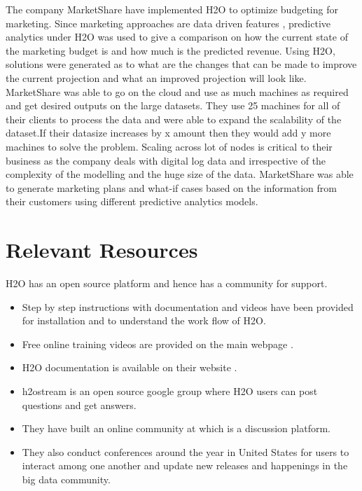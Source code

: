 \documentclass[9pt,twocolumn,twoside]{../../styles/osajnl}
\begin{document}
The company MarketShare have implemented H2O to optimize budgeting for
marketing. Since marketing approaches are data driven features ,
predictive analytics under H2O was used to give a comparison on how
the current state of the marketing budget is and how much is the
predicted revenue\cite{www-h2o-marketshare}. Using H2O, solutions were generated as to what are
the changes that can be made to improve the current projection and
what an improved projection will look like. MarketShare was able to go on the cloud and use as much
machines as required and get desired outputs on the large
datasets. They use 25 machines for all of their clients to process the
data and were able to expand the scalability of the dataset.If their
datasize increases by x amount then they would add y more machines to
solve the problem\cite{www-h2o-marketshare}. Scaling across lot of nodes is critical to their
business as the company deals with digital log data and irrespective
of the complexity of the modelling and the huge size of the data\cite{www-h2o-marketshare}. MarketShare was able to generate marketing plans and what-if cases based on the information from their customers using different predictive analytics models.

\section {Relevant Resources}

H2O has an open source platform and hence has a community for support.
\begin{itemize}
\item Step by step instructions with documentation and videos have
   been provided for installation and to understand the work flow of
   H2O\cite{www-h2o-webpage}.
\item Free online training videos are provided on the main webpage
  \cite{www-h2o-learn}.
\item H2O documentation is available on their website
  \cite{www-h2o-webpage}.
\item h2ostream is an open source google group where H2O users can
    post questions and get answers.
\item They have built an online community at\cite{www-h2o-community}
  which is a discussion platform.
\item They also conduct conferences around the year in United States
    for users to interact among one another and update new releases
    and happenings in the big data community\cite{www-h2o-meetups}.
\end{itemize}
\end{document}
